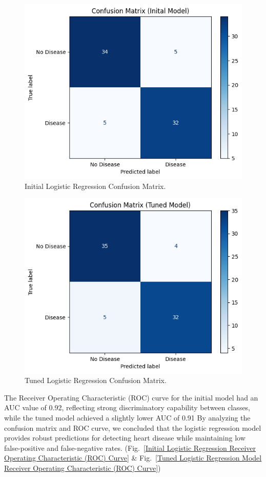 \begin{figure}[htbp]
    \centerline{\includegraphics[width=0.8\columnwidth]{img/confusion_matrix_initial.png}}
    \caption{Initial Logistic Regression Confusion Matrix.}\label{Initial Logistic Regression Confusion Matrix}
\end{figure}

\begin{figure}[htbp]
    \centerline{\includegraphics[width=0.8\columnwidth]{img/confusion_matrix_tuned.png}}
    \caption{Tuned Logistic Regression Confusion Matrix.}\label{Tuned Logistic Regression Confusion Matrix}
\end{figure}

The Receiver Operating Characteristic (ROC) curve for the initial model had an AUC value of 0.92, reflecting strong discriminatory capability between classes, while the tuned model achieved a slightly lower AUC of 0.91
By analyzing the confusion matrix and ROC curve, we concluded that the logistic regression model provides robust predictions for detecting heart disease while maintaining low false-positive and false-negative rates. (Fig.~\ref{Initial Logistic Regression Receiver Operating Characteristic (ROC) Curve} \& Fig.~\ref{Tuned Logistic Regression Model Receiver Operating Characteristic (ROC) Curve})

